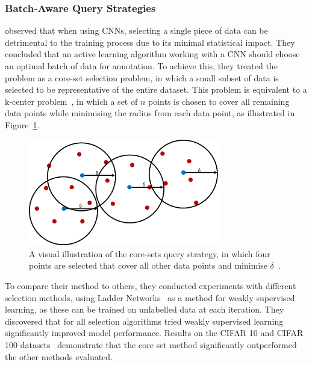 \subsubsection{Batch-Aware Query Strategies}
\cite{sener2017active} observed that when using CNNs, selecting a single piece of data can be detrimental to the training process due to its minimal statistical impact. They concluded that an active learning algorithm working with a CNN should choose an optimal batch of data for annotation. To achieve this, they treated the problem as a core-set selection problem, in which a small subset of data is selected to be representative of the entire dataset. This problem is equivalent to a k-center problem~\citep{farahani2009facility}, in which a set of $n$ points is chosen to cover all remaining data points while minimising the radius from each data point, as illustrated in Figure~\ref{fig:core-set}.

\begin{figure}[h]
	\centering
	\includegraphics[width=0.75\textwidth]{images/core-set.png}
	\caption{A visual illustration of the core-sets query strategy, in which four points are selected that cover all other data points and minimise $\delta$~\citep{sener2017active}.}
	\label{fig:core-set}
\end{figure}

To compare their method to others, they conducted experiments with different selection methods, using Ladder Networks~\citep{rasmus2015semi} as a method for weakly supervised learning, as these can be trained on unlabelled data at each iteration. They discovered that for all selection algorithms tried weakly supervised learning significantly improved model performance. Results on the CIFAR 10 and CIFAR 100 datasets~\citep{krizhevsky2009learning} demonstrate that the core set method significantly outperformed the other methods evaluated.

